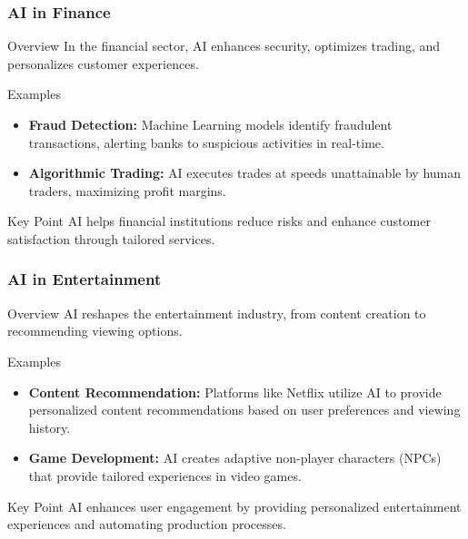 \documentclass[aspectratio=169]{beamer}
\begin{document}
\begin{frame}[fragile]
    \frametitle{AI in Finance}
    \begin{block}{Overview}
        In the financial sector, AI enhances security, optimizes trading, and personalizes customer experiences.
    \end{block}
    
    \begin{block}{Examples}
        \begin{itemize}
            \item \textbf{Fraud Detection:} Machine Learning models identify fraudulent transactions, alerting banks to suspicious activities in real-time.
            \item \textbf{Algorithmic Trading:} AI executes trades at speeds unattainable by human traders, maximizing profit margins.
        \end{itemize}
    \end{block}

    \begin{block}{Key Point}
        AI helps financial institutions reduce risks and enhance customer satisfaction through tailored services.
    \end{block}
\end{frame}

\begin{frame}[fragile]
    \frametitle{AI in Entertainment}
    \begin{block}{Overview}
        AI reshapes the entertainment industry, from content creation to recommending viewing options.
    \end{block}
    
    \begin{block}{Examples}
        \begin{itemize}
            \item \textbf{Content Recommendation:} Platforms like Netflix utilize AI to provide personalized content recommendations based on user preferences and viewing history.
            \item \textbf{Game Development:} AI creates adaptive non-player characters (NPCs) that provide tailored experiences in video games.
        \end{itemize}
    \end{block}

    \begin{block}{Key Point}
        AI enhances user engagement by providing personalized entertainment experiences and automating production processes.
    \end{block}
\end{frame}
\end{document}
